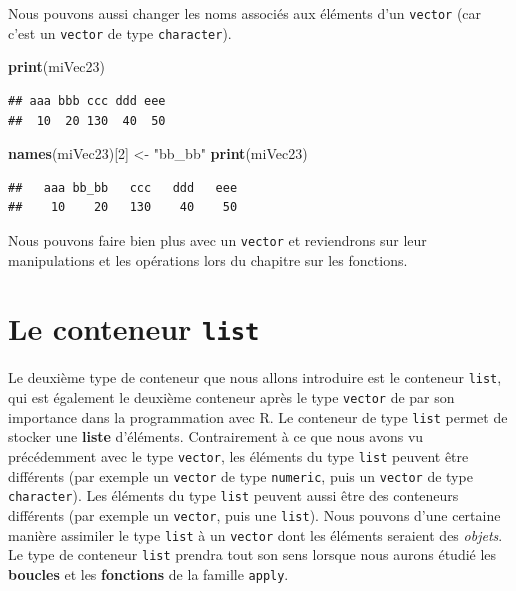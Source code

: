 \documentclass[twoside,symmetric]{book}
\newenvironment{Shaded}{}{}
\newcommand{\DecValTok}[1]{#1}
\newcommand{\KeywordTok}[1]{\textbf{#1}}
\newcommand{\NormalTok}[1]{#1}
\newcommand{\StringTok}[1]{#1}
\begin{document}
Nous pouvons aussi changer les noms associés aux éléments d'un \texttt{vector} (car c'est un \texttt{vector} de type \texttt{character}).

\begin{Shaded}
\begin{Highlighting}[]
\KeywordTok{print}\NormalTok{(miVec23)}
\end{Highlighting}
\end{Shaded}

\begin{verbatim}
## aaa bbb ccc ddd eee 
##  10  20 130  40  50
\end{verbatim}

\begin{Shaded}
\begin{Highlighting}[]
\KeywordTok{names}\NormalTok{(miVec23)[}\DecValTok{2}\NormalTok{] <-}\StringTok{ "bb_bb"}
\KeywordTok{print}\NormalTok{(miVec23)}
\end{Highlighting}
\end{Shaded}

\begin{verbatim}
##   aaa bb_bb   ccc   ddd   eee 
##    10    20   130    40    50
\end{verbatim}

Nous pouvons faire bien plus avec un \texttt{vector} et reviendrons sur leur manipulations et les opérations lors du chapitre sur les fonctions.

\hypertarget{l014list}{%
\section{\texorpdfstring{Le conteneur \texttt{list}}{Le conteneur list}}\label{l014list}}

Le deuxième type de conteneur que nous allons introduire est le conteneur \texttt{list}, qui est également le deuxième conteneur après le type \texttt{vector} de par son importance dans la programmation avec R. Le conteneur de type \texttt{list} permet de stocker une \textbf{liste} d'éléments. Contrairement à ce que nous avons vu précédemment avec le type \texttt{vector}, les éléments du type \texttt{list} peuvent être différents (par exemple un \texttt{vector} de type \texttt{numeric}, puis un \texttt{vector} de type \texttt{character}). Les éléments du type \texttt{list} peuvent aussi être des conteneurs différents (par exemple un \texttt{vector}, puis une \texttt{list}). Nous pouvons d'une certaine manière assimiler le type \texttt{list} à un \texttt{vector} dont les éléments seraient des \emph{objets}. Le type de conteneur \texttt{list} prendra tout son sens lorsque nous aurons étudié les \textbf{boucles} et les \textbf{fonctions} de la famille \texttt{apply}.
\end{document}
